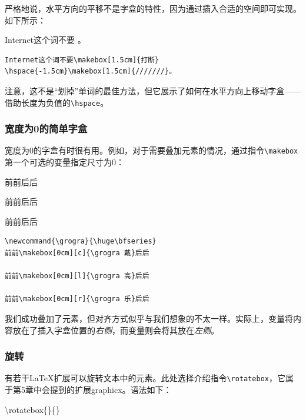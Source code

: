 严格地说，水平方向的平移不是字盒的特性，因为通过插入合适的空间即可实现。如下所示：

\begin{codelist}[4.13]{
  Internet这个词不要
\hspace{-1.5cm}\makebox[1.5cm]{///////}。
}
\begin{verbatim}
Internet这个词不要\makebox[1.5cm]{打断}
\hspace{-1.5cm}\makebox[1.5cm]{///////}。\end{verbatim}
\end{codelist}

注意，这不是“划掉”单词的最佳方法，但它展示了如何在水平方向上移动字盒——借助长度为负值的\verb|\hspace|。

\subsubsection{宽度为0的简单字盒}

宽度为0的字盒有时很有用。例如，对于需要叠加元素的情况，通过指令\verb|\makebox|第一个可选的变量指定尺寸为0：

\begin{codelist}[4.14]{
  \newcommand{\grogra}{\huge\bfseries}
前前\makebox[0cm][c]{\grogra 戴}后后

前前\makebox[0cm][l]{\grogra 高}后后

前前\makebox[0cm][r]{\grogra 乐}后后
}
\begin{verbatim}
\newcommand{\grogra}{\huge\bfseries}
前前\makebox[0cm][c]{\grogra 戴}后后

前前\makebox[0cm][l]{\grogra 高}后后

前前\makebox[0cm][r]{\grogra 乐}后后\end{verbatim}
\end{codelist}

我们成功叠加了元素，但对齐方式似乎与我们想象的不太一样。实际上，变量将内容放在了插入字盒位置的\emph{右侧}，而变量则会将其放在\emph{左侧}。

\subsubsection{旋转}

有若干\LaTeX 扩展可以旋转文本中的元素。此处选择介绍指令\verb|\rotatebox|，它属于第5章中会提到的扩展\textsf{graphicx}。语法如下：

\begin{dmd}
\backslash rotatebox\{\}\{\}
\end{dmd}

